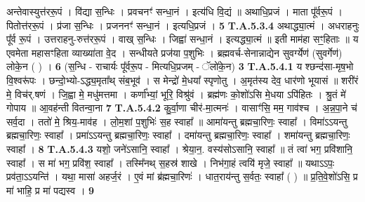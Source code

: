 \documentclass[17pt]{extarticle}
\begin{document}
                  अन्तेवास्युत्त॑ररू॒पं । वि॑द्या स॒न्धिः ।  प्रवचनꣳ॑ सन्धा॒नं । इत्य॑धि वि॒द्यं ॥  अथाधि॒प्रजं । माता पू᳚र्वरू॒पं । पितोत्त॑ररू॒पं । प्र॑जा स॒न्धिः । प्रजननꣳ॑ सन्धा॒नं । इत्यधि॒प्रजं । \textbf{ 5} \newline
                  \newline
                                                                  \textbf{ T.A.5.3.4} \newline
                  अथाद्ध्या॒त्मं । अधराहनुः पू᳚र्व रू॒पं । उत्तराहनु-रुत्त॑ररू॒पं । वाख् स॒न्धिः । जिह्वा॑ सन्धा॒नं । इत्यद्ध्या॒त्मं ॥ इती माम॑हा सꣳ॒॒हिताः ॥ य एवमेता महासꣳहिता व्याख्या॑ता वे॒द । सन्धीयते प्रज॑या प॒शुभिः । ब्रह्मवर्च-सेनान्नाद्येन सुवर्ग्येण॑ (सुवर्गेण॑) लोके॒न ( ) । \textbf{ 6} \newline
                  \newline
                                                        (स॒न्धि - राचार्यः पू᳚र्वरू॒प - मित्यधि॒प्रजम् - ॅलो॑के॒न) \textbf{3} \newline \newline
                                \textbf{ T.A.5.4.1} \newline
                  य श्छन्द॑सा-मृष॒भो वि॒श्वरू॑पः । छन्दो॒भ्यो-ऽद्ध्य॒मृता᳚थ् संब॒भूव॑ । स मेन्द्रो॑ मे॒धया᳚ स्पृणोतु । अ॒मृत॑स्य देव॒ धार॑णो भूयासं ॥  शरी॑रं मे॒ विच॑र्.षणं । जि॒ह्वा मे॒ मधु॑मत्तमा । कर्णा᳚भ्यां॒ भूरि॒ विश्रु॑वं । ब्रह्म॑णः को॒शो॑ऽसि मे॒धया ऽपि॑हितः । श्रु॒तं मे॑ गोपाय ॥ आ॒वह॑न्ती वितन्वा॒ना \textbf{ 7} \newline
                  \newline
                                                                  \textbf{ T.A.5.4.2} \newline
                  कु॒र्वा॒णा चीर॑-मा॒त्मनः॑ । वासाꣳ॑सि॒ मम॒ गाव॑श्च । अ॒न्न॒पा॒ने च॑ सर्व॒दा । ततो॑ मे॒ श्रिय॒-माव॑ह । लो॒म॒शां प॒शुभिः॑ स॒ह स्वाहा᳚ ॥ आमा॑यन्तु ब्रह्मचा॒रिणः॒ स्वाहा᳚ ।  विमा॑ऽऽयन्तु ब्रह्मचा॒रिणः॒ स्वाहा᳚ । प्रमा॑ऽऽयन्तु ब्रह्मचा॒रिणः॒ स्वाहा᳚ । दमा॑यन्तु ब्रह्मचा॒रिणः॒ स्वाहा᳚ । शमा॑यन्तु ब्रह्मचा॒रिणः॒ स्वाहा᳚ । \textbf{ 8} \newline
                  \newline
                                                                  \textbf{ T.A.5.4.3} \newline
                  यशो॒ जने॑ऽसानि॒ स्वाहा᳚ । श्रेया॒न॒. वस्य॑सोऽसानि॒ स्वाहा᳚ ॥ तं त्वा॑ भग॒ प्रवि॑शानि॒ स्वाहा᳚ । स मा॑ भग॒ प्रवि॑श॒ स्वाहा᳚ । तस्मि᳚नथ् स॒हस्र॑ शाखे । निभ॑गा॒हं त्वयि॑ मृजे॒ स्वाहा᳚ ॥ यथाऽऽपः॒ प्रव॑ता॒ऽऽयन्ति॑ । यथा॒ मासा॑ अहर्ज॒रं ।  ए॒वं मां ब्र॑ह्मचा॒रिणः॑ ।  धात॒राय॑न्तु स॒र्वतः॒ स्वाहा᳚ ( ) ॥  प्र॒ति॒वे॒शो॑ऽसि॒ प्र मा॑ भाहि॒ प्र मा॑ पद्यस्व । \textbf{ 9} \newline
\end{document}
